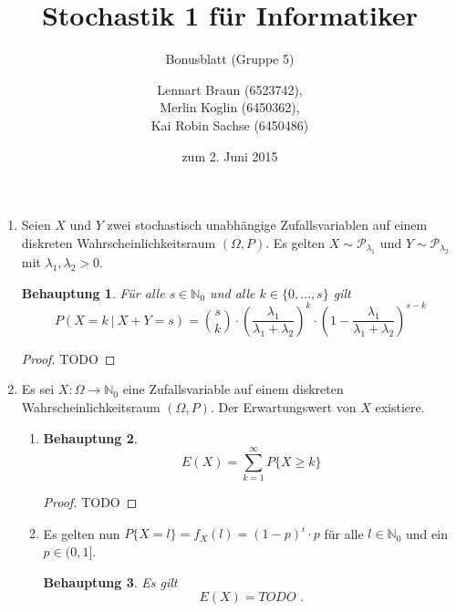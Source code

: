 \documentclass[a4paper]{scrartcl}
\title{Stochastik 1 für Informatiker}
\subtitle{Bonusblatt (Gruppe 5)}
\author{
    Lennart Braun (6523742), \\
    Merlin Koglin (6450362), \\
    Kai Robin Sachse (6450486)
}
\date{zum 2. Juni 2015}
\newtheorem*{behaupt}{Behauptung}
\begin{document}
\maketitle

\begin{enumerate}[label=\bfseries\arabic*.]
    \item
        Seien $X$ und $Y$ zwei stochastisch unabhängige Zufallsvariablen auf
        einem diskreten Wahrscheinlichkeitsraum $(\Omega, P)$.
        Es gelten $X \sim \mathcal{P}_{\lambda_1}$ und
        $Y \sim \mathcal{P}_{\lambda_2}$ mit $\lambda_1, \lambda_2 > 0$.
        \begin{behaupt}
            Für alle $s \in \mathbb{N}_0$ und alle $k \in \{0, \ldots, s\}$ gilt
            \begin{equation*}
                P \left( X = k \ |\ X + Y = s \right) = \binom{s}{k} \cdot
                \left( \frac{\lambda_1}{\lambda_1 + \lambda_2} \right)^k \cdot
                \left( 1 - \frac{\lambda_1}{\lambda_1 + \lambda_2} \right)^{s-k}
            \end{equation*}
        \end{behaupt}
        \begin{proof}
            TODO
        \end{proof}

    \item
        Es sei $X\colon \Omega \to \mathbb{N}_0$ eine Zufallsvariable auf einem
        diskreten Wahrscheinlichkeitsraum $(\Omega, P)$.
        Der Erwartungswert von $X$ existiere.
        \begin{enumerate}[label=(\alph*)]
            \item
                \begin{behaupt}
                    \begin{equation*}
                        E(X) = \sum_{k=1}^\infty P\{X \geq k\}
                    \end{equation*}
                \end{behaupt}
                \begin{proof}
                    TODO
                \end{proof}

            \item
                Es gelten nun $P\{X = l\} = f_X(l) = (1 - p)^i \cdot p$ für alle
                $l \in \mathbb{N}_0$ und ein $p \in (0, 1]$.
                \begin{behaupt}
                    Es gilt
                    \begin{equation*}
                        E(X) = TODO
                        \text{ .}
                    \end{equation*}
                \end{behaupt}

        \end{enumerate}
\end{enumerate}
\end{document}
